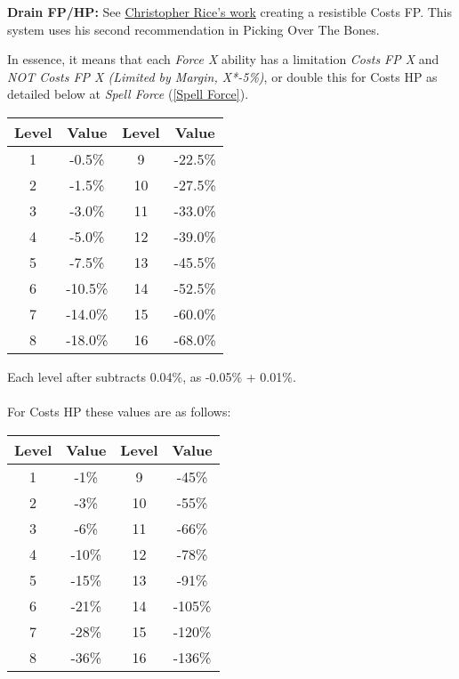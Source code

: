 \begin{multicols*}{2}
	\textbf{Drain FP/HP:}
	See \textcolor{Blue}{\href{https://www.ravensnpennies.com/gurps101-fp-cost-limited-by-margin/}{Christopher Rice's work}} creating a resistible Costs FP. This system uses his second recommendation in Picking Over The Bones.
	
	In essence, it means that each \textit{Force X} ability has a limitation \textit{Costs FP X} and \textit{NOT Costs FP X (Limited by Margin, X*-5\%)}, or double this for Costs HP as detailed below at \textit{Spell Force} (\ref{Spell Force}).
	
	\begin{center}\label{drain_mods}
		\begin{tabular}{|c|c|c|c|}
			\hline
			Level & Value & Level & Value \\
			\hline
			\hline
			1 & -0.5\% & 9 & -22.5\% \\
			2 & -1.5\% & 10 & -27.5\% \\
			3 & -3.0\% & 11 & -33.0\% \\
			4 & -5.0\% & 12 & -39.0\% \\
			5 & -7.5\% & 13 & -45.5\% \\
			6 & -10.5\% & 14 & -52.5\% \\
			7 & -14.0\% & 15 & -60.0\% \\
			8 & -18.0\% & 16 & -68.0\% \\
			\hline
		\end{tabular}
	\end{center}
	
	Each level after subtracts 0.04\%, as -0.05\% + 0.01\%.
	\\\\
	For Costs HP these values are as follows:
	\begin{center}
		\begin{tabular}{|c|c|c|c|}
			\hline
			Level & Value & Level & Value \\
			\hline
			\hline
			1 & -1\% & 9 & -45\% \\
			2 & -3\% & 10 & -55\% \\
			3 & -6\% & 11 & -66\% \\
			4 & -10\% & 12 & -78\% \\
			5 & -15\% & 13 & -91\% \\
			6 & -21\% & 14 & -105\% \\
			7 & -28\% & 15 & -120\% \\
			8 & -36\% & 16 & -136\% \\
			\hline
		\end{tabular}
	\end{center}
	

\end{multicols*}
